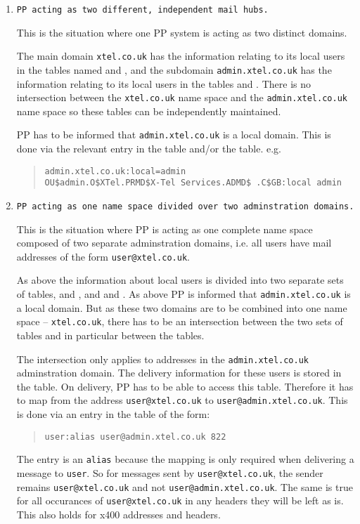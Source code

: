 \begin{enumerate}

\item {\tt PP acting as two different, independent mail hubs.}

This is the situation where one PP system is acting as two distinct
domains. 

The main domain \verb+xtel.co.uk+ has the information relating to its
local users in the tables named
 and ,
and the subdomain \verb+admin.xtel.co.uk+ has the information relating
to its local users in the tables  and
.
There is no intersection between the \verb+xtel.co.uk+ name space and
the \verb+admin.xtel.co.uk+ name space so these tables can be
independently maintained.

PP has to be informed that \verb+admin.xtel.co.uk+ is a local domain.
This is done via the relevant entry  in the  table and/or
the  table.
e.g.
\begin{quote}\small\begin{verbatim}
admin.xtel.co.uk:local=admin
OU$admin.O$XTel.PRMD$X-Tel Services.ADMD$ .C$GB:local admin
\end{verbatim}\end{quote}

\item {\tt PP acting as one name space divided over two
adminstration domains.}

This is the situation where PP is acting as one complete name space
composed of two separate adminstration domains, i.e. all users have
mail addresses of the form \verb+user@xtel.co.uk+.

As above the information about local users is divided into two
separate sets of tables,  and , and
 and .
As above PP is informed that \verb+admin.xtel.co.uk+ is a local
domain.
But as these two domains are to be combined into one name space --
\verb+xtel.co.uk+, there has to be an intersection between the two
sets of tables and in particular between the  tables.

The intersection only applies to addresses in the
\verb+admin.xtel.co.uk+ adminstration domain.
The delivery information for these users is stored in the
 table.
On delivery, PP has to be able to access this table.
Therefore it has to map from the address \verb+user@xtel.co.uk+ to
\verb+user@admin.xtel.co.uk+.
This is done via an entry in the  table of the form:
\begin{quote}\small\begin{verbatim}
user:alias user@admin.xtel.co.uk 822
\end{verbatim}\end{quote}
The entry is an \verb+alias+ because the mapping is only required when
delivering a message to \verb+user+.
So for messages sent by \verb+user@xtel.co.uk+, the sender remains
\verb+user@xtel.co.uk+ and not \verb+user@admin.xtel.co.uk+.
The same is true for all occurances of \verb+user@xtel.co.uk+ in
any headers they will be left as is.
This also holds for x400 addresses and headers.


\end{enumerate}
